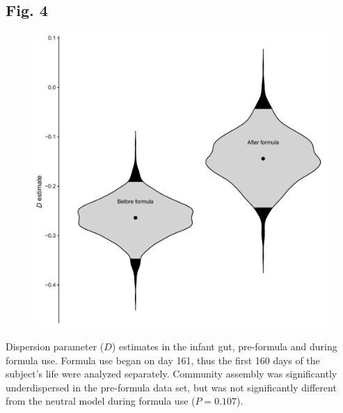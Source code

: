 \documentclass{article}
\begin{document}
{\subsection{Fig. 4}\label{sec:figure4}
\begin{figure}[ht]
	\centering
	\includegraphics[scale=0.80]{figs/Fig_4.pdf}
\end{figure}
Dispersion parameter (\(D\)) estimates in the infant gut, pre-formula and during formula use. Formula use began on day 161, thus the first 160 days of the subject's life were analyzed separately. Community assembly was significantly underdispersed in the pre-formula data set, but was not significantly different from the neutral model during formula use (\(P = 0.107\)).
\newpage

}%




\newpage
\end{document}
